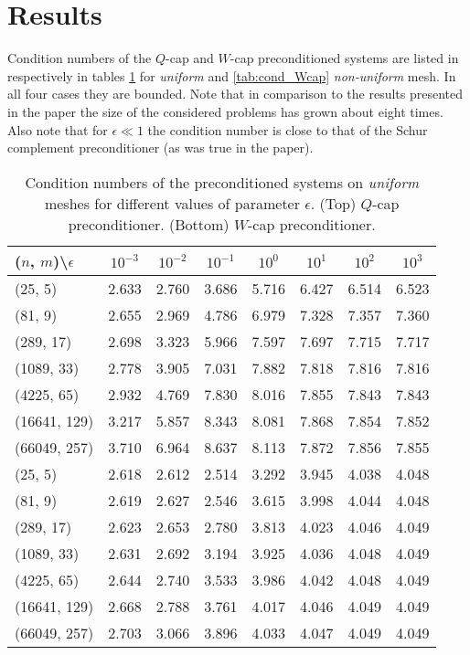 \documentclass[10pt, a4paper]{article}
\begin{document}
\section*{Results}
Condition numbers of the $Q$-cap and $W$-cap preconditioned systems are listed in
respectively in tables \ref{tab:cond_Qcap} for \textit{uniform} and 
\ref{tab:cond_Wcap} \textit{non-uniform} mesh. In all four cases they are 
bounded. Note that in comparison to the results presented in the paper the size 
of the considered problems has grown about eight times. Also 
note that for $\epsilon \ll 1$ the condition number is close to that of the Schur 
complement preconditioner (as was true in the paper).
\begin{table}[ht]
  \caption{Condition numbers of the preconditioned systems on \textit{uniform}
  meshes for different values of parameter $\epsilon$. (Top) $Q$-cap
  preconditioner. (Bottom) $W$-cap preconditioner.
}
\label{tab:cond_Qcap}
\footnotesize{
\begin{tabular}{l|ccccccc}
\hline
($n$, $m$)\textbackslash $\epsilon$ & $10^{-3}$ & $10^{-2}$ & $10^{-1}$ & $10^{0}$ & $10^{1}$ & $10^{2}$ & $10^{3}$\\
\hline
(25, 5) & 2.633 & 2.760 & 3.686 & 5.716 & 6.427 & 6.514 & 6.523\\
(81, 9) & 2.655 & 2.969 & 4.786 & 6.979 & 7.328 & 7.357 & 7.360\\
(289, 17) & 2.698 & 3.323 & 5.966 & 7.597 & 7.697 & 7.715 & 7.717\\
(1089, 33) & 2.778 & 3.905 & 7.031 & 7.882 & 7.818 & 7.816 & 7.816\\
(4225, 65) & 2.932 & 4.769 & 7.830 & 8.016 & 7.855 & 7.843 & 7.843\\
(16641, 129) & 3.217 & 5.857 & 8.343 & 8.081 & 7.868 & 7.854 & 7.852\\
(66049, 257) & 3.710 & 6.964 & 8.637 & 8.113 & 7.872 & 7.856 & 7.855\\
\hline
\hline
(25, 5) & 2.618 & 2.612 & 2.514 & 3.292 & 3.945 & 4.038 & 4.048\\
(81, 9) & 2.619 & 2.627 & 2.546 & 3.615 & 3.998 & 4.044 & 4.048\\
(289, 17) & 2.623 & 2.653 & 2.780 & 3.813 & 4.023 & 4.046 & 4.049\\
(1089, 33) & 2.631 & 2.692 & 3.194 & 3.925 & 4.036 & 4.048 & 4.049\\
(4225, 65) & 2.644 & 2.740 & 3.533 & 3.986 & 4.042 & 4.048 & 4.049\\
(16641, 129) & 2.668 & 2.788 & 3.761 & 4.017 & 4.046 & 4.049 & 4.049\\
(66049, 257) & 2.703 & 3.066 & 3.896 & 4.033 & 4.047 & 4.049 & 4.049\\
\hline
\end{tabular}
}
\end{table}
\end{document}
